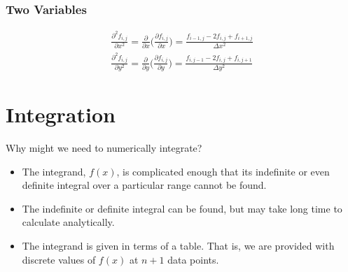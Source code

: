 \documentclass[12pt]{article}
\begin{document}
\subsubsection*{Two Variables}
\begin{align*}
\frac{\partial^2 f_{i,j}}{\partial x^2} = \frac{\partial}{\partial x}\bigl(\frac{\partial f_{i,j}}{\partial x}\bigr) =
\frac{f_{i-1,j} - 2f_{i,j} + f_{i+1,j}}{\Delta x^2} \\
%
\frac{\partial^2 f_{i,j}}{\partial y^2} = \frac{\partial}{\partial y}\bigl(\frac{\partial f_{i,j}}{\partial y}\bigr) =
\frac{f_{i,j-1} - 2f_{i,j} + f_{i,j+1}}{\Delta y^2}
\end{align*}
\begin{center}
\end{center}


\section*{Integration}
Why might we need to numerically integrate?
\begin{itemize}
\item The integrand, $f(x)$, is complicated enough that its
indefinite or even definite integral over a particular range cannot
be found.
\item The indefinite or definite integral can be found, but may take
long time to calculate analytically.
\item The integrand is given in terms of a table. That is, we are
provided with discrete values of $f(x)$ at $n+1$ data points.
\end{itemize}
\end{document}
